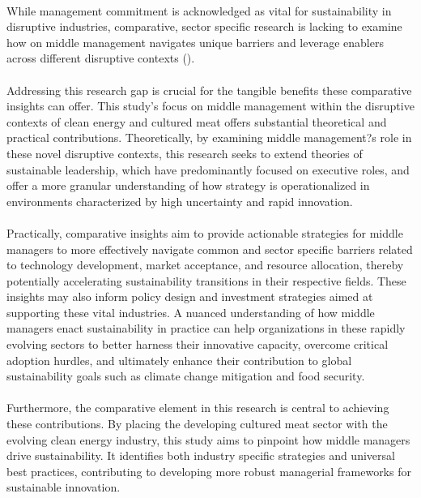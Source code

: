 \paragraph*{} While management commitment is acknowledged as vital for sustainability in disruptive industries, comparative, sector specific research is lacking to examine how on middle management navigates unique barriers and leverage enablers across different disruptive contexts (\textcite{Lozano2015, Egri2000}).

\paragraph*{} Addressing this research gap is crucial for the tangible benefits these comparative insights can offer. This study's focus on middle management within the disruptive contexts of clean energy and cultured meat offers substantial theoretical and practical contributions. Theoretically, by examining middle management?s role in these novel disruptive contexts, this research seeks to extend theories of sustainable leadership, which have predominantly focused on executive roles, and offer a more granular understanding of how strategy is operationalized in environments characterized by high uncertainty and rapid innovation.

\paragraph*{} Practically, comparative insights aim to provide actionable strategies for middle managers to more effectively navigate common and sector specific barriers related to technology development, market acceptance, and resource allocation, thereby potentially accelerating sustainability transitions in their respective fields. These insights may also inform policy design and investment strategies aimed at supporting these vital industries. A nuanced understanding of how middle managers enact sustainability in practice can help organizations in these rapidly evolving sectors to better harness their innovative capacity, overcome critical adoption hurdles, and ultimately enhance their contribution to global sustainability goals such as climate change mitigation and food security.

\paragraph*{} Furthermore, the comparative element in this research is central to achieving these contributions. By placing the developing cultured meat sector with the evolving clean energy industry, this study aims to pinpoint how middle managers drive sustainability. It identifies both industry specific strategies and universal best practices, contributing to developing more robust managerial frameworks for sustainable innovation.
